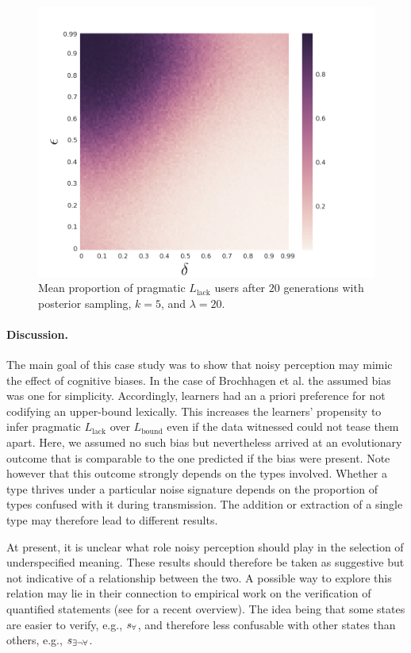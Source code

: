 \documentclass[10pt,a4paper]{article}
\newcommand{\state}{\ensuremath{s}\xspace}		%
\newcommand{\mystate}[1]{\ensuremath{\state_{\text{#1}}}\xspace} %
\newcommand{\ssome}{\mystate{\ensuremath{\exists\neg\forall}}}
\newcommand{\sall}{\mystate{\ensuremath{\forall}}}
\begin{document}
\begin{figure}[ht]
\centering
    \includegraphics[scale=0.33]{../code/plots/quantifiers-posterior-sampling-k5.png}
  \caption{Mean proportion of pragmatic $L_{\text{lack}}$ users after $20$ generations with posterior sampling, $k = 5$, and $\lambda = 20$.}
  \label{fig:quant}
\end{figure}


\paragraph{Discussion.} The main goal of this case study was to show that noisy perception may mimic the effect of cognitive biases. In the case of Brochhagen et al. the assumed bias was one for simplicity. Accordingly, learners had an a priori preference for not codifying an upper-bound lexically. This increases the learners' propensity to infer pragmatic $L_{\text{lack}}$ over $L_{\text{bound}}$ even if the data witnessed could not tease them apart. Here, we assumed no such bias but nevertheless arrived at an evolutionary outcome that is comparable to the one predicted if the bias were present. Note however that this outcome strongly depends on the types involved. Whether a type thrives under a particular noise signature depends on the proportion of types confused with it during transmission. The addition or extraction of a single type may therefore lead to different results. 

At present, it is unclear what role noisy perception should play in the selection of underspecified meaning. These results should therefore be taken as suggestive but not indicative of a relationship between the two. A possible way to explore this relation may lie in their connection to empirical work on the verification of quantified statements (see \citealt{szymanik:2016} for a recent overview). The idea being that some states are easier to verify, e.g., $\sall$, and therefore less confusable with other states than others, e.g., $\ssome$. 
\end{document}
